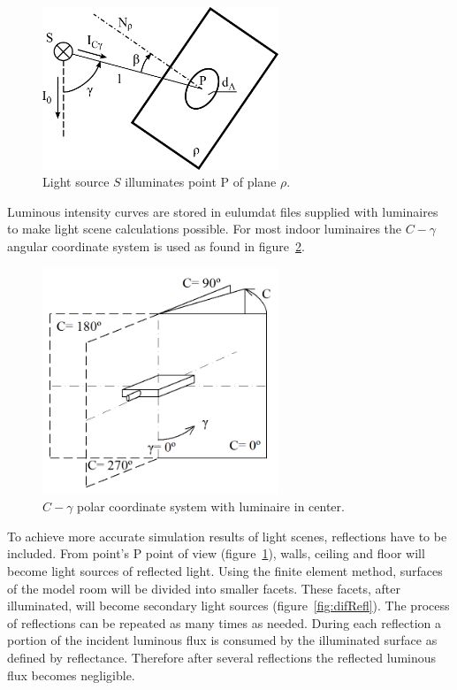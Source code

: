 \begin{figure}[htb]
  \centering
  \includegraphics[width=200pt]{315_osvetlenost_bodovym_zdrojem_2}
  \caption{Light source $S$ illuminates point P of plane $\rho$.}
  \label{fig:osv}
\end{figure}

Luminous intensity curves are stored in eulumdat files supplied with luminaires to make light scene calculations possible. For most indoor luminaires the $C-\gamma$ angular coordinate system is used as found in figure~\ref{fig:cgamma}.

\begin{figure}[htb]
  \centering
  \includegraphics[width=200pt]{Cgama}
  \caption{$C-\gamma$ polar coordinate system with luminaire in center.}
  \label{fig:cgamma}
\end{figure}

To achieve more accurate simulation results of light scenes, reflections have to be included. From point's P point of view (figure~\ref{fig:osv}), walls, ceiling and floor will become light sources of reflected light. Using the finite element method, surfaces of the model room will be divided into smaller facets. These facets, after illuminated, will become secondary light sources (figure~\ref{fig:difRefl}). The process of reflections can be repeated as many times as needed. During each reflection a portion of the incident luminous flux is consumed by the illuminated surface as defined by reflectance. Therefore after several reflections the reflected luminous flux becomes negligible.

